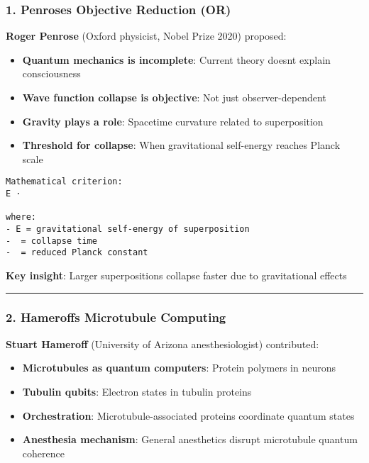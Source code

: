 \subsubsection{1. Penrose\textquotesingle s Objective Reduction
(OR)}\label{penroses-objective-reduction-or}

\textbf{Roger Penrose} (Oxford physicist, Nobel Prize 2020) proposed:

\begin{itemize}
\tightlist
\item
  \textbf{Quantum mechanics is incomplete}: Current theory
  doesn\textquotesingle t explain consciousness
\item
  \textbf{Wave function collapse is objective}: Not just
  observer-dependent
\item
  \textbf{Gravity plays a role}: Spacetime curvature related to
  superposition
\item
  \textbf{Threshold for collapse}: When gravitational self-energy
  reaches Planck scale
\end{itemize}

\begin{verbatim}
Mathematical criterion:
E ·   

where:
- E = gravitational self-energy of superposition
-  = collapse time
-  = reduced Planck constant
\end{verbatim}

\textbf{Key insight}: Larger superpositions collapse faster due to
gravitational effects

\begin{center}\rule{0.5\linewidth}{0.5pt}\end{center}

\subsubsection{2. Hameroff\textquotesingle s Microtubule
Computing}\label{hameroffs-microtubule-computing}

\textbf{Stuart Hameroff} (University of Arizona anesthesiologist)
contributed:

\begin{itemize}
\tightlist
\item
  \textbf{Microtubules as quantum computers}: Protein polymers in
  neurons
\item
  \textbf{Tubulin qubits}: Electron states in tubulin proteins
\item
  \textbf{Orchestration}: Microtubule-associated proteins coordinate
  quantum states
\item
  \textbf{Anesthesia mechanism}: General anesthetics disrupt microtubule
  quantum coherence
\end{itemize}

